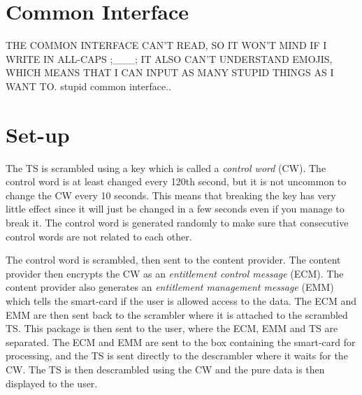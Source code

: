 \section{Common Interface} \label{sec:CI}
THE COMMON INTERFACE CAN'T READ, SO IT WON'T MIND IF I WRITE IN ALL-CAPS ;\_\_\_;
IT ALSO CAN'T UNDERSTAND EMOJIS, WHICH MEANS THAT I CAN INPUT AS MANY STUPID 
THINGS AS I WANT TO. stupid common interface..

\section{Set-up} \label{sec:setup}
The TS is scrambled using a key which is called a \emph{control word} (CW). The 
control word is at least changed every 120th second, but it is not uncommon to 
change the CW every 10 seconds. This means that breaking the key has very little 
effect since it will just be changed in a few seconds even if you manage to 
break it. The control word is generated randomly to make sure that consecutive 
control words are not related to each other. 

The control word is scrambled, then sent to the content provider. The content 
provider then encrypts the CW as an \emph{entitlement control message} (ECM). 
The content provider also generates an \emph{entitlement management message} 
(EMM) which tells the smart-card if the user is allowed access to the data. The 
ECM and EMM are then sent back to the scrambler where it is attached to the 
scrambled TS. This package is then sent to the user, where the ECM, EMM and TS 
are separated. The ECM and EMM are sent to the box containing the smart-card 
for processing, and the TS is sent directly to the descrambler where it waits 
for the CW. The TS is then descrambled using the CW and the pure data is then 
displayed to the user.
